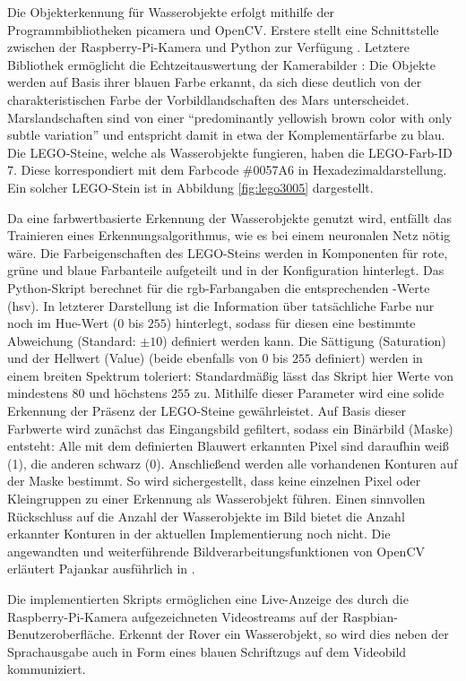Die Objekterkennung für Wasserobjekte erfolgt mithilfe der Programmbibliotheken picamera und OpenCV.
Erstere stellt eine Schnittstelle zwischen der Raspberry-Pi-Kamera und Python zur Verfügung \cite{cox2014}.
Letztere Bibliothek ermöglicht die Echtzeitauswertung der Kamerabilder \cite{pajankar2015}:
Die Objekte werden auf Basis ihrer blauen Farbe erkannt, da sich diese deutlich von der charakteristischen Farbe der Vorbildlandschaften des Mars unterscheidet.
Marslandschaften sind von einer \enquote{predominantly yellowish brown color with only subtle variation} \cite[S. 1]{maki1999} und entspricht damit in etwa der Komplementärfarbe zu blau.
Die LEGO-Steine, welche als Wasserobjekte fungieren, haben die LEGO-Farb-ID $7$.
Diese korrespondiert mit dem Farbcode \#0057A6 in Hexadezimaldarstellung.
Ein solcher LEGO-Stein ist in Abbildung \ref{fig:lego3005} dargestellt.

Da eine farbwertbasierte Erkennung der Wasserobjekte genutzt wird, entfällt das Trainieren eines Erkennungsalgorithmus, wie es bei einem neuronalen Netz nötig wäre.
Die Farbeigenschaften des LEGO-Steins werden in Komponenten für rote, grüne und blaue Farbanteile aufgeteilt und in der Konfiguration hinterlegt.
Das Python-Skript berechnet für die \acs{rgb}-Farbangaben die entsprechenden -Werte (\acl{hsv}).
In letzterer Darstellung ist die Information über tatsächliche Farbe nur noch im Hue-Wert ($0$ bis $255$) hinterlegt, sodass für diesen eine bestimmte Abweichung (Standard: $\pm 10$) definiert werden kann.
Die Sättigung (Saturation) und der Hellwert (Value) (beide ebenfalls von $0$ bis $255$ definiert) werden in einem breiten Spektrum toleriert:
Standardmäßig lässt das Skript hier Werte von mindestens $80$ und höchstens $255$ zu.
Mithilfe dieser Parameter wird eine solide Erkennung der Präsenz der LEGO-Steine gewährleistet.
Auf Basis dieser Farbwerte wird zunächst das Eingangsbild gefiltert, sodass ein Binärbild (Maske) entsteht:
Alle mit dem definierten Blauwert erkannten Pixel sind daraufhin weiß (1), die anderen schwarz (0).
Anschließend werden alle vorhandenen Konturen auf der Maske bestimmt.
So wird sichergestellt, dass keine einzelnen Pixel oder Kleingruppen zu einer Erkennung als Wasserobjekt führen.
Einen sinnvollen Rückschluss auf die Anzahl der Wasserobjekte im Bild bietet die Anzahl erkannter Konturen in der aktuellen Implementierung noch nicht.
Die angewandten und weiterführende Bildverarbeitungsfunktionen von OpenCV erläutert Pajankar ausführlich in \cite{pajankar2015}.

Die implementierten Skripts ermöglichen eine Live-Anzeige des durch die Raspberry-Pi-Kamera aufgezeichneten Videostreams auf der Raspbian-Benutzeroberfläche.
Erkennt der Rover ein Wasserobjekt, so wird dies neben der Sprachausgabe auch in Form eines blauen Schriftzugs auf dem Videobild kommuniziert.